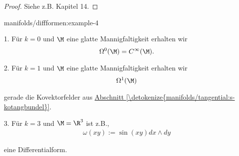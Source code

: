\documentclass[letterpaper,10pt,german]{jupyterBook}
\begin{document}
\begin{proof}
 Siehe z.B. \cite{Lee03} Kapitel 14.
\end{proof}
\begin{example}{}{manifolds/diffformen:example-4}



\par
1. Für \(k=0\) und \(\M\) eine glatte Mannigfaltigkeit erhalten wir
\begin{align*}
\Omega^0(\M) = C^\infty(\M).
\end{align*}


\par
2. Für \(k=1\) und \(\M\) eine glatte Mannigfaltigkeit erhalten wir
\begin{align*}
\Omega^1(\M)
\end{align*}
\par
gerade die Kovektorfelder aus \hyperref[\detokenize{manifolds/tangential:s-kotangbundel}]{Abschnitt \ref{\detokenize{manifolds/tangential:s-kotangbundel}}}.



\par
3. Für \(k=3\) und \(\M=\R^3\) ist z.B.,
\begin{align*}
\omega(xy) := \sin(xy) dx\wedge dy
\end{align*}
\par
eine Differentialform.
\end{example}
\end{document}
